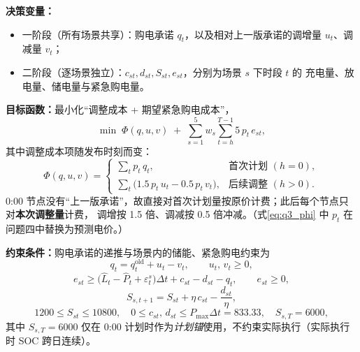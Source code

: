 \documentclass[12pt,a4paper]{article}
\begin{document}
\textbf{决策变量：}
\begin{itemize}
    \item 一阶段（所有场景共享）：购电承诺 $q_t$，以及相对上一版承诺的调增量 $u_t$、调减量 $v_t$；
    \item 二阶段（逐场景独立）：$c_{st}, d_{st}, S_{st}, e_{st}$，分别为场景 $s$ 下时段 $t$ 的
          充电量、放电量、储电量与紧急购电量。
\end{itemize}

\textbf{目标函数：}最小化“调整成本 + 期望紧急购电成本”，
\begin{equation}
    \min \; \Phi(q,u,v) \;+\; \sum_{s=1}^{5} w_s \sum_{t=h}^{T-1} 5\,p_t\, e_{st},
    \label{eq:q3_obj}
\end{equation}
其中调整成本项随发布时刻而变：
\begin{equation}
    \Phi(q,u,v) =
    \begin{cases}
        \displaystyle \sum_{t} p_t\,q_t, & \text{首次计划 }(h = 0), \\[6pt]
        \displaystyle \sum_{t} \big(1.5\,p_t\,u_t - 0.5\,p_t\,v_t\big), & \text{后续调整 }(h > 0).
    \end{cases}
    \label{eq:q3_phi}
\end{equation}
0:00 节点没有“上一版承诺”，故直接对首次计划量按原价计费；此后每个节点只对\textbf{本次调整量}计费，
调增按 1.5 倍、调减按 0.5 倍冲减。（式\eqref{eq:q3_phi} 中 $p_t$ 在问题四中替换为预测电价。）

\textbf{约束条件：}购电承诺的递推与场景内的储能、紧急购电约束为
\begin{equation}
    q_t = q_t^{\text{old}} + u_t - v_t, \qquad u_t,\,v_t \geq 0,
    \label{eq:q3_commit}
\end{equation}
\begin{equation}
    e_{st} \geq \big(\hat{L}_t - \hat{P}_t + \varepsilon^{s}_{t}\big)\Delta t
              + c_{st} - d_{st} - q_t, \qquad e_{st} \geq 0,
    \label{eq:q3_emg}
\end{equation}
\begin{equation}
    S_{s,t+1} = S_{st} + \eta\, c_{st} - \frac{d_{st}}{\eta},
    \label{eq:q3_soc}
\end{equation}
\begin{equation}
    1200 \leq S_{st} \leq 10800,\quad
    0 \leq c_{st},\, d_{st} \leq P_{\max}\Delta t = 833.33,\quad
    S_{s,T} = 6000,
    \label{eq:q3_bounds}
\end{equation}
其中 $S_{s,T} = 6000$ 仅在 0:00 计划时作为\emph{计划锚}使用，不约束实际执行（实际执行时 SOC 跨日连续）。
\end{document}
